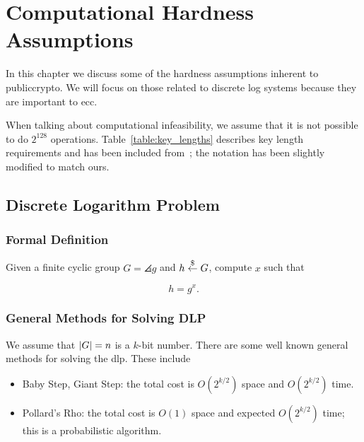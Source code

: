 \chapter{Computational Hardness Assumptions}
\label{chap:hardness}

In this chapter we discuss some of the hardness assumptions inherent
to \gls{publiccrypto}.
We will focus on those related to \gls{discrete log} systems
because they are important to \gls{ecc}.

When talking about computational infeasibility, we assume that it is
not possible to do $2^{128}$ operations.
Table~\ref{table:key_lengths} describes key length requirements
and has been included from~\cite[Page 381]{IntroModernCrypto};
the notation has been slightly modified to match ours.





\section{Discrete Logarithm Problem}
\label{sec:hardness_dlp}

\subsection{Formal Definition}

\begin{defn}
Given a \gls{finite cyclic group} $G = \angles{g}$ and $h\stackrel{\$}{\leftarrow}{}G$,
compute $x$ such that

\begin{equation}
    h = g^{x}.
\end{equation}
\end{defn}

\subsection{General Methods for Solving DLP}

We assume that $\left| G \right| = n$ is a $k$-bit number.
There are some well known general methods for solving the \gls{dlp}.
These include

\begin{itemize}
\item Baby Step, Giant Step:
    the total cost is $O(2^{k/2})$ space and $O(2^{k/2})$ time.
\item Pollard's Rho:
    the total cost is $O(1)$ space and expected $O(2^{k/2})$ time;
    this is a probabilistic algorithm.
\end{itemize}

